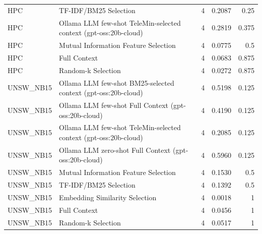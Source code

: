 \begin{tabular}{llrrr}
HPC & TF-IDF/BM25 Selection & 4 & 0.2087 & 0.25 \\
HPC & Ollama LLM few-shot TeleMin-selected context (gpt-oss:20b-cloud) & 4 & 0.2819 & 0.375 \\
HPC & Mutual Information Feature Selection & 4 & 0.0775 & 0.5 \\
HPC & Full Context & 4 & 0.0683 & 0.875 \\
HPC & Random-k Selection & 4 & 0.0272 & 0.875 \\
UNSW_NB15 & Ollama LLM few-shot BM25-selected context (gpt-oss:20b-cloud) & 4 & 0.5198 & 0.125 \\
UNSW_NB15 & Ollama LLM few-shot Full Context (gpt-oss:20b-cloud) & 4 & 0.4190 & 0.125 \\
UNSW_NB15 & Ollama LLM few-shot TeleMin-selected context (gpt-oss:20b-cloud) & 4 & 0.2085 & 0.125 \\
UNSW_NB15 & Ollama LLM zero-shot Full Context (gpt-oss:20b-cloud) & 4 & 0.5960 & 0.125 \\
UNSW_NB15 & Mutual Information Feature Selection & 4 & 0.1530 & 0.5 \\
UNSW_NB15 & TF-IDF/BM25 Selection & 4 & 0.1392 & 0.5 \\
UNSW_NB15 & Embedding Similarity Selection & 4 & 0.0018 & 1 \\
UNSW_NB15 & Full Context & 4 & 0.0456 & 1 \\
UNSW_NB15 & Random-k Selection & 4 & 0.0517 & 1 \\
\bottomrule
\end{tabular}
